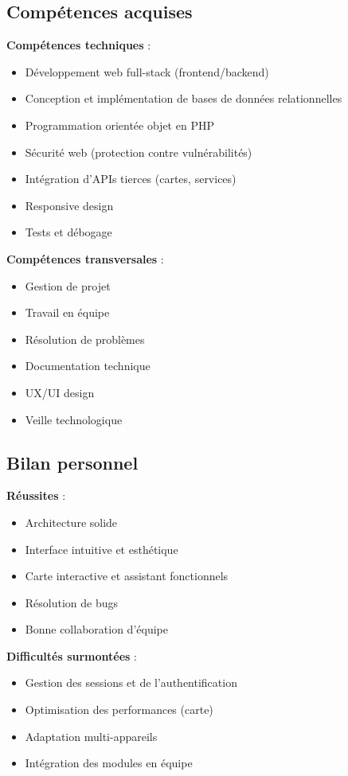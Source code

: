 \documentclass[a4paper,12pt]{article}
\begin{document}
\subsection{Compétences acquises}
\textbf{Compétences techniques} :
\begin{itemize}
  \item Développement web full-stack (frontend/backend)
  \item Conception et implémentation de bases de données relationnelles
  \item Programmation orientée objet en PHP
  \item Sécurité web (protection contre vulnérabilités)
  \item Intégration d’APIs tierces (cartes, services)
  \item Responsive design
  \item Tests et débogage
\end{itemize}

\textbf{Compétences transversales} :
\begin{itemize}
  \item Gestion de projet
  \item Travail en équipe
  \item Résolution de problèmes
  \item Documentation technique
  \item UX/UI design
  \item Veille technologique
\end{itemize}

\subsection{Bilan personnel}
\textbf{Réussites} :
\begin{itemize}
  \item Architecture solide
  \item Interface intuitive et esthétique
  \item Carte interactive et assistant fonctionnels
  \item Résolution de bugs
  \item Bonne collaboration d’équipe
\end{itemize}

\textbf{Difficultés surmontées} :
\begin{itemize}
  \item Gestion des sessions et de l’authentification
  \item Optimisation des performances (carte)
  \item Adaptation multi-appareils
  \item Intégration des modules en équipe
\end{itemize}
\end{document}
